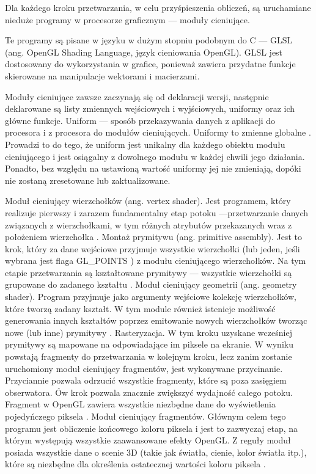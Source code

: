  Dla każdego kroku przetwarzania, w celu przyśpieszenia obliczeń, są uruchamiane nieduże programy w procesorze graficznym --- moduły cieniujące.
 
Te programy są pisane w języku w dużym stopniu podobnym do C --- GLSL (ang. OpenGL Shading Language, język cieniowania OpenGL). GLSL jest dostosowany do wykorzystania w grafice, ponieważ zawiera przydatne funkcje skierowane na manipulacje wektorami i macierzami. 

Moduły cieniujące zawsze zaczynają się od deklaracji wersji, następnie deklarowane są listy zmiennych wejściowych i wyjściowych, uniformy oraz ich główne funkcje. Uniform --- sposób przekazywania danych z aplikacji do procesora i z procesora do modułów cieniujących. Uniformy to zmienne globalne \cite{slownik}. Prowadzi to do tego, że uniform jest unikalny dla każdego obiektu modułu cieniującego i jest osiągalny z dowolnego modułu w każdej chwili jego działania. Ponadto, bez względu na ustawioną wartość uniformy jej nie zmieniają, dopóki nie zostaną zresetowane lub zaktualizowane.
\begin{itemize} 
\itemi Moduł cieniujący wierzchołków (ang. vertex shader). Jest programem, który realizuje pierwszy i zarazem fundamentalny etap potoku ---przetwarzanie danych związanych z wierzchołkami, w tym różnych atrybutów przekazanych wraz z położeniem wierzchołka \cite{slownik}.
\itemi Montaż prymitywu (ang. primitive assembly). Jest to krok, który za dane wejściowe przyjmuje wszystkie wierzchołki (lub jeden, jeśli wybrana jest flaga GL\_POINTS ) z modułu cieniującego wierzchołków. Na tym etapie przetwarzania są kształtowane prymitywy --- wszystkie wierzchołki są grupowane do zadanego kształtu \cite{opengltutorial}.
\itemi Moduł cieniujący geometrii (ang. geometry shader). Program przyjmuje jako argumenty wejściowe kolekcję wierzchołków, które tworzą zadany kształt. W tym module również istenieje możliwość generowania innych kształtów poprzez emitowanie nowych wierzchołków tworząc nowe (lub inne) prymitywy \cite{slownik}. 
\itemi Rasteryzacja. W tym kroku uzyskane wcześniej prymitywy są mapowane na odpowiadające im piksele na ekranie. W wyniku powstają fragmenty do przetwarzania w kolejnym kroku, lecz zanim zostanie uruchomiony moduł cieniujący fragmentów, jest wykonywane przycinanie. Przyciannie pozwala odrzucić wszystkie fragmenty, które są poza zasięgiem obserwatora. Ów krok pozwala znacznie zwiększyć wydajność całego potoku. Fragment w OpenGL zawiera wszystkie niezbędne dane do wyświetlenia pojedyńczego piksela \cite{slownik}.
\itemi Moduł cieniujący fragmentów. Głównym celem tego programu jest obliczenie końcowego koloru piksela i jest to zazwyczaj etap, na którym występują wszystkie zaawansowane efekty OpenGL. Z reguły moduł posiada wszystkie dane o scenie 3D (takie jak światła, cienie, kolor światła itp.), które są niezbędne dla określenia ostatecznej wartości koloru piksela \cite{slownik}.
\end{itemize}

